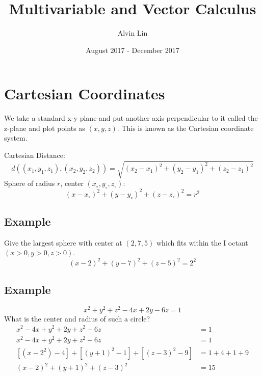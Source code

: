 \documentclass[letterpaper, 12pt]{math}
\title{Multivariable and Vector Calculus}
\author{Alvin Lin}
\date{August 2017 - December 2017}
\begin{document}
\maketitle

\section*{Cartesian Coordinates}
We take a standard x-y plane and put another axis perpendicular to it called
the z-plane and plot points as \( (x, y, z) \). This is known as the Cartesian
coordinate system.
\begin{center}
\end{center}

\noindent Cartesian Distance:
\[ d((x_{1}, y_{1}, z_{1}), (x_{2}, y_{2}, z_{2})) = \sqrt{
  (x_{2}-x_{1})^{2}+(y_{2}-y_{1})^{2}+(z_{2}-z_{1})^{2}} \]
Sphere of radius \( r \), center \( (x_{\circ},y_{\circ},z_{\circ}) \):
\[ (x-x_{\circ})^{2}+(y-y_{\circ})^{2}+(z-z_{\circ})^{2} = r^{2} \]

\subsection*{Example}
Give the largest sphere with center at \( (2,7,5) \) which fits within the I
octant \( (x>0,y>0,z>0) \).
\[ (x-2)^{2}+(y-7)^{2}+(z-5)^{2} = 2^{2} \]

\subsection*{Example}
\[ x^{2}+y^{2}+z^{2}-4x+2y-6z = 1 \]
What is the center and radius of such a circle?
\begin{align*}
  x^{2}-4x+y^{2}+2y+z^{2}-6z &= 1 \\
  x^{2}-4x+y^{2}+2y+z^{2}-6z &= 1 \\
  [(x-2^{2})-4]+[(y+1)^{2}-1]+[(z-3)^{2}-9] &= 1+4+1+9 \\
  (x-2)^{2}+(y+1)^{2}+(z-3)^{2} &= 15 \\
\end{align*}
\end{document}
